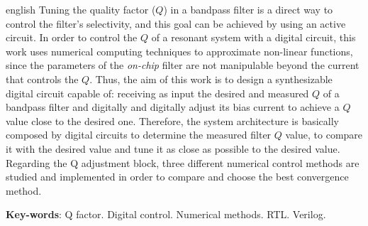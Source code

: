 \begin{resumo}[Abstract]
 \begin{otherlanguage*}{english}
     Tuning the quality factor ($Q$) in a bandpass filter is a direct way to control the filter's selectivity, and this goal can be achieved by using an active circuit. In order to control the $Q$ of a resonant system with a digital circuit, this work uses numerical computing techniques to approximate non-linear functions, since the parameters of the \textit{on-chip} filter are not manipulable beyond the current that controls the $Q$. Thus, the aim of this work is to design a synthesizable digital circuit capable of: receiving as input the desired and measured $Q$ of a bandpass filter and digitally and digitally adjust its bias current to achieve a $Q$ value close to the desired one. Therefore, the system architecture is basically composed by digital circuits to determine the measured filter $Q$ value, to compare it with the desired value and tune it as close as possible to the desired value. Regarding the Q adjustment block, three different numerical control methods are studied and implemented in order to compare and choose the best convergence method.

   \vspace{\onelineskip}
 
   \noindent 
   \textbf{Key-words}: Q factor. Digital control. Numerical methods. RTL. Verilog.
 \end{otherlanguage*}
\end{resumo}
